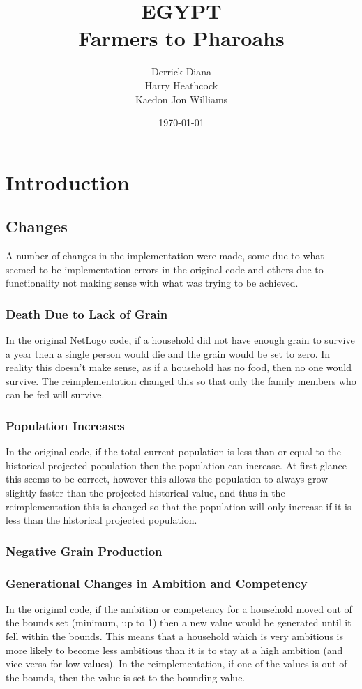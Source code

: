 \documentclass[12pt]{article}
\title{EGYPT\\Farmers to Pharoahs}
\author{Derrick Diana\\Harry Heathcock\\Kaedon Jon Williams}
\date{\today}
\begin{document}
	\maketitle
	\begin{abstract}
			
	\end{abstract}
	
	\section{Introduction}
		\subsection{Changes}
			A number of changes in the implementation were made, some due to what seemed to be implementation errors in the original code and others due to functionality not making sense with what was trying to be achieved.
			\subsubsection{Death Due to Lack of Grain}
				In the original NetLogo code, if a household did not have enough grain to survive a year then a single person would die and the grain would be set to zero. In reality this doesn't make sense, as if a household has no food, then no one would survive. The reimplementation changed this so that only the family members who can be fed will survive.\\
			\subsubsection{Population Increases}
				In the original code, if the total current population is less than or equal to the historical projected population then the population can increase. At first glance this seems to be correct, however this allows the population to always grow slightly faster than the projected historical value, and thus in the reimplementation this is changed so that the population will only increase if it is less than the historical projected population.
			\subsubsection{Negative Grain Production}
				
			\subsubsection{Generational Changes in Ambition and Competency}
				In the original code, if the ambition or competency for a household moved out of the bounds set (minimum, up to 1) then a new value would be generated until it fell within the bounds. This means that a household which is very ambitious is more likely to become less ambitious than it is to stay at a high ambition (and vice versa for low values). In the reimplementation, if one of the values is out of the bounds, then the value is set to the bounding value.
			
\end{document}

